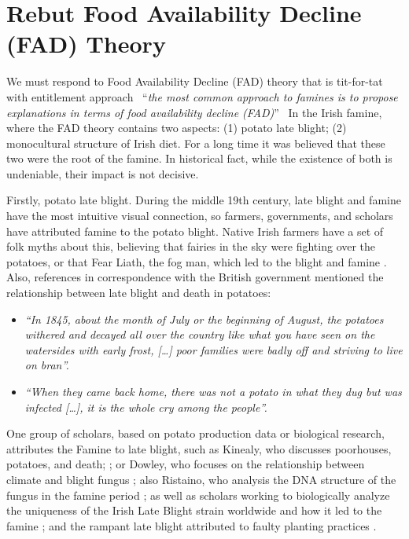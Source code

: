 \newpage

\section{Rebut Food Availability Decline (FAD) Theory}

We must respond to Food Availability Decline (FAD) theory that is tit-for-tat with entitlement approach \textendash\ ``\textit{the most common approach to famines is to propose explanations in terms of food availability decline (FAD)}'' \citep{sen1982poverty} \textendash\ In the Irish famine, where the FAD theory contains two aspects: (1) potato late blight; (2) monocultural structure of Irish diet. For a long time it was believed that these two were the root of the famine. In historical fact, while the existence of both is undeniable, their impact is not decisive.

Firstly, potato late blight. During the middle 19th century, late blight and famine have the most intuitive visual connection, so farmers, governments, and scholars have attributed famine to the potato blight. Native Irish farmers have a set of folk myths about this, believing that fairies in the sky were fighting over the potatoes, or that Fear Liath, the fog man, which led to the blight and famine \citep{bartoletti2001black}. Also, references in correspondence with the British government mentioned the relationship between late blight and death in potatoes:

\begin{itemize}
    \item[] \textit{``In 1845, about the month of July or the beginning of August, the potatoes withered and decayed all over the country like what you have seen on
    the watersides with early frost, [\ldots] poor families were badly off and striving to live on bran''.} \citep{mcclureletter1848}
    \item[] \textit{``When they came back home, there was not a potato in what they dug but was infected [\ldots], it is the whole cry among the people''.} \citep{blackwellletter1845}
\end{itemize}

One group of scholars, based on potato production data or biological research, attributes the Famine to late blight, such as Kinealy, who discusses poorhouses, potatoes, and death; \citep{kinealy1990irish}; or Dowley, who focuses on the relationship between climate and blight fungus \citep{dowley1997potato}; also Ristaino, who analysis the DNA structure of the fungus in the famine period \citep{ristaino2006tracking}; as well as scholars working to biologically analyze the uniqueness of the Irish Late Blight strain worldwide and how it led to the famine \citep{goss2014irish}; and the rampant late blight attributed to faulty planting practices \citep{lidwell2020cultivating}.

